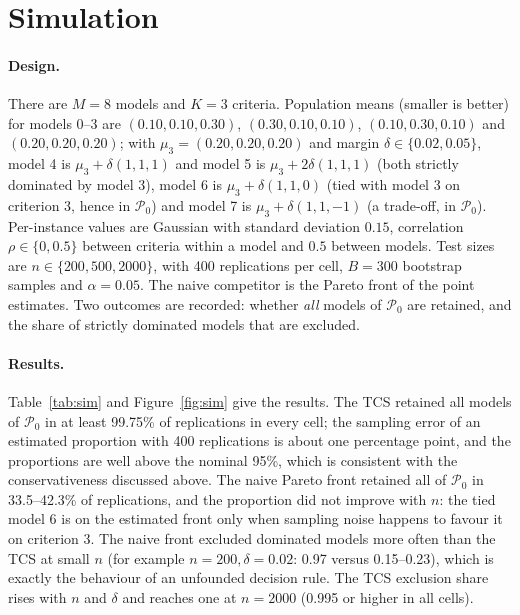 \documentclass[pdflatex,sn-mathphys-num,iicol]{sn-jnl}
\theoremstyle{thmstyleone}
\theoremstyle{thmstyletwo}
\begin{document}
\section{Simulation}\label{sec:sim}
\paragraph{Design.} There are $M=8$ models and $K=3$ criteria. Population means (smaller is better) for models 0--3 are $(0.10,0.10,0.30)$, $(0.30,0.10,0.10)$, $(0.10,0.30,0.10)$ and $(0.20,0.20,0.20)$; with $\mu_3=(0.20,0.20,0.20)$ and margin $\delta\in\{0.02,0.05\}$, model 4 is $\mu_3+\delta(1,1,1)$ and model 5 is $\mu_3+2\delta(1,1,1)$ (both strictly dominated by model 3), model 6 is $\mu_3+\delta(1,1,0)$ (tied with model 3 on criterion 3, hence in $\mathcal{P}_0$) and model 7 is $\mu_3+\delta(1,1,-1)$ (a trade-off, in $\mathcal{P}_0$). Per-instance values are Gaussian with standard deviation $0.15$, correlation $\rho\in\{0,0.5\}$ between criteria within a model and $0.5$ between models. Test sizes are $n\in\{200,500,2000\}$, with 400 replications per cell, $B=300$ bootstrap samples and $\alpha=0.05$. The naive competitor is the Pareto front of the point estimates. Two outcomes are recorded: whether \emph{all} models of $\mathcal{P}_0$ are retained, and the share of strictly dominated models that are excluded.

\paragraph{Results.} Table~\ref{tab:sim} and Figure~\ref{fig:sim} give the results. The TCS retained all models of $\mathcal{P}_0$ in at least 99.75\% of replications in every cell; the sampling error of an estimated proportion with 400 replications is about one percentage point, and the proportions are well above the nominal 95\%, which is consistent with the conservativeness discussed above. The naive Pareto front retained all of $\mathcal{P}_0$ in 33.5--42.3\% of replications, and the proportion did not improve with $n$: the tied model 6 is on the estimated front only when sampling noise happens to favour it on criterion 3. The naive front excluded dominated models more often than the TCS at small $n$ (for example $n=200,\delta=0.02$: 0.97 versus 0.15--0.23), which is exactly the behaviour of an unfounded decision rule. The TCS exclusion share rises with $n$ and $\delta$ and reaches one at $n=2000$ (0.995 or higher in all cells).
\end{document}
